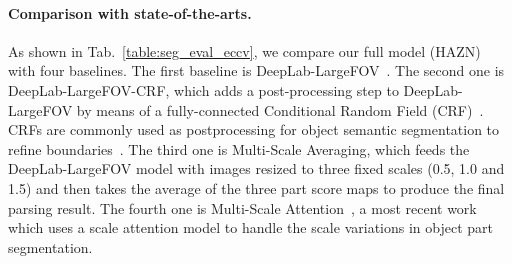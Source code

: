 \paragraph{\textbf{Comparison with state-of-the-arts.}}
As shown in Tab.~\ref{table:seg_eval_eccv}, we compare our full model (HAZN) with four baselines. The first baseline is DeepLab-LargeFOV~\cite{chen2016deeplab}.
The second one is DeepLab-LargeFOV-CRF, which adds a post-processing step to DeepLab-LargeFOV by means of a fully-connected Conditional Random Field (CRF)~\cite{krahenbuhl2011efficient}. CRFs are commonly used as postprocessing for object semantic segmentation to refine boundaries~\cite{chen2016deeplab}.
The third one is Multi-Scale Averaging, which feeds the DeepLab-LargeFOV model with images resized to three fixed scales (0.5, 1.0 and 1.5) and then
takes the average of the three part score maps to produce the final parsing result.
The fourth one is Multi-Scale Attention~\cite{chen2016attention}, a most recent work which uses a scale attention model to handle the scale variations in object part segmentation.
\begin{table}[!tb]
\centering
\setlength{\tabcolsep}{5pt}
\caption{Part segmentation accuracy (\%) on PASCAL-Person-Part in terms of mean IOU. We compare our full model (HAZN) with two sub-models and four state-of-the-art baselines.}
\label{table:seg_eval_eccv}
\end{table}


